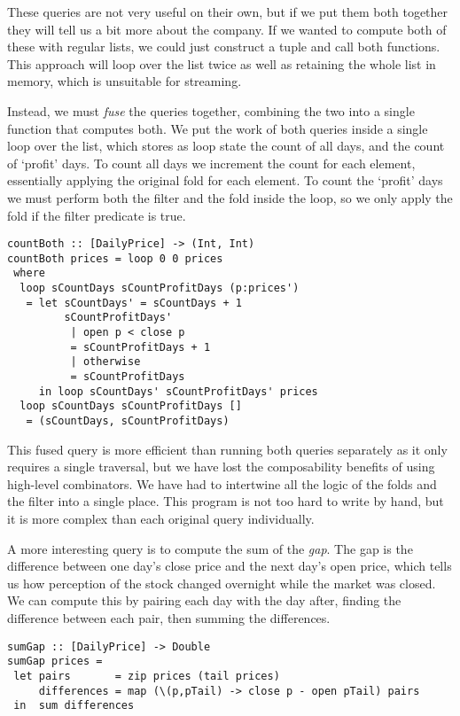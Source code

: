 These queries are not very useful on their own, but if we put them both together they will tell us a bit more about the company.
If we wanted to compute both of these with regular lists, we could just construct a tuple and call both functions.
This approach will loop over the list twice as well as retaining the whole list in memory, which is unsuitable for streaming.

Instead, we must \emph{fuse} the queries together, combining the two into a single function that computes both.
We put the work of both queries inside a single loop over the list, which stores as loop state the count of all days, and the count of `profit' days.
To count all days we increment the count for each element, essentially applying the original fold for each element.
To count the `profit' days we must perform both the filter and the fold inside the loop, so we only apply the fold if the filter predicate is true.

\begin{lstlisting}
countBoth :: [DailyPrice] -> (Int, Int)
countBoth prices = loop 0 0 prices
 where
  loop sCountDays sCountProfitDays (p:prices')
   = let sCountDays' = sCountDays + 1
         sCountProfitDays'
          | open p < close p
          = sCountProfitDays + 1
          | otherwise
          = sCountProfitDays
     in loop sCountDays' sCountProfitDays' prices
  loop sCountDays sCountProfitDays []
   = (sCountDays, sCountProfitDays)
\end{lstlisting}

This fused query is more efficient than running both queries separately as it only requires a single traversal, but we have lost the composability benefits of using high-level combinators.
We have had to intertwine all the logic of the folds and the filter into a single place.
This program is not too hard to write by hand, but it is more complex than each original query individually.

A more interesting query is to compute the sum of the \emph{gap}.
The gap is the difference between one day's close price and the next day's open price, which tells us how perception of the stock changed overnight while the market was closed.
We can compute this by pairing each day with the day after, finding the difference between each pair, then summing the differences.

\begin{lstlisting}
sumGap :: [DailyPrice] -> Double
sumGap prices =
 let pairs       = zip prices (tail prices)
     differences = map (\(p,pTail) -> close p - open pTail) pairs
 in  sum differences
\end{lstlisting}

